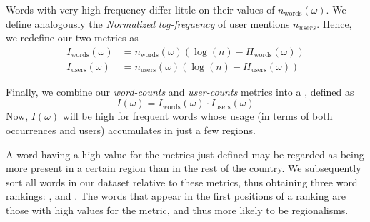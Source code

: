 Words with very high frequency differ little on their values of $n_\text{words}(\omega)$. We define analogously the \emph{Normalized log-frequency} of user mentions $n_{users}$. Hence, we redefine our two metrics as
\begin{align}
  I_\text{words}(\omega) &= n_\text{words}(\omega) (\log(n) - H_\text{words}(\omega)) \\
  I_\text{users}(\omega) &= n_\text{users}(\omega) (\log(n) - H_\text{users}(\omega)) 
\end{align}

Finally, we combine our \emph{word-counts} and \emph{user-counts} metrics into a \mixedmetric{}, defined as
\begin{equation}
  I(\omega) = I_\text{words}(\omega) \cdot I_\text{users}(\omega)
\end{equation}
Now, $I(\omega)$ will be high for frequent words whose usage (in terms of both occurrences and users) accumulates in just a few regions.

A word having a high value for the metrics just defined may be regarded as being more present in a certain region than in the rest of the country. We subsequently sort all words in our dataset relative to these metrics, thus obtaining three word rankings: \wordrank{}, \userrank{} and
\mixedrank{}. The words that appear in the first positions of a ranking are those with high values for the metric, and thus more likely to be regionalisms.




